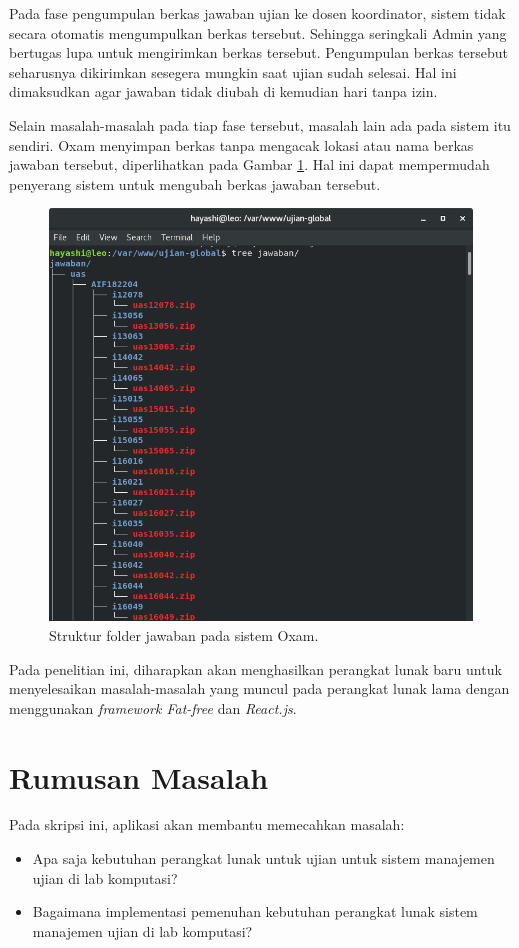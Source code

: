Pada fase pengumpulan berkas jawaban ujian ke dosen koordinator, sistem tidak
secara otomatis mengumpulkan berkas tersebut. Sehingga seringkali Admin yang
bertugas lupa untuk mengirimkan berkas tersebut. Pengumpulan berkas tersebut
seharusnya dikirimkan sesegera mungkin saat ujian sudah selesai. Hal ini
dimaksudkan agar jawaban tidak diubah di kemudian hari tanpa izin.

Selain masalah-masalah pada tiap fase tersebut, masalah lain ada pada sistem itu
sendiri. Oxam menyimpan berkas tanpa mengacak lokasi atau nama berkas jawaban
tersebut, diperlihatkan pada Gambar \ref{fig:ss-folder-jawaban}. Hal ini dapat
mempermudah penyerang sistem untuk mengubah berkas jawaban tersebut.

\begin{figure}
    \centering
    \includegraphics[width=0.6\paperwidth]{Gambar/ss-struktur-folder-jawaban.png}
    \caption{Struktur folder jawaban pada sistem Oxam.}
    \label{fig:ss-folder-jawaban}
\end{figure}

Pada penelitian ini, diharapkan akan menghasilkan perangkat lunak baru untuk
menyelesaikan masalah-masalah yang muncul pada perangkat lunak lama dengan
menggunakan \textit{framework Fat-free} dan \textit{React.js}.

\section{Rumusan Masalah}
\label{sec:rumusan}
Pada skripsi ini, aplikasi akan membantu memecahkan masalah:
\begin{itemize}
    \item Apa saja kebutuhan perangkat lunak untuk ujian untuk sistem manajemen
    ujian di lab komputasi?
    
    \item Bagaimana implementasi pemenuhan kebutuhan perangkat lunak sistem
    manajemen ujian di lab komputasi?
\end{itemize}

